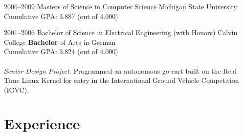 \documentclass[print]{template/friggeri-cv} %
\begin{document}
\begin{entrylist}

\entry
{2006--2009}
{Masters {\normalfont of Science in Computer Science}}
{Michigan State University}
{Cumulative GPA:  3.887 (out of 4.000)}

\entry
{2001--2006}
{Bachelor {\normalfont of Science in Electrical Engineering (with Honors)}}
{Calvin College}
{\textbf{Bachelor} of Arts in German \\
Cumulative GPA:  3.824 (out of 4.000) \\
\\
\emph{Senior Design Project}: Programmed an autonomous go-cart built on the Real
Time Linux Kernel for entry in the International Ground Vehicle Competition (IGVC).}

\end{entrylist}

\section{Experience}
\end{document}
